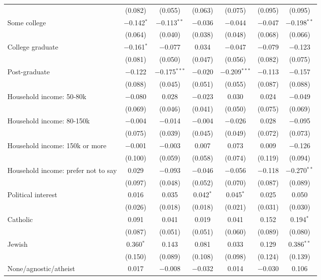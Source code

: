 \begin{tabular}{@{\extracolsep{5pt}}lcccccc}
  & (0.082) & (0.055) & (0.063) & (0.075) & (0.095) & (0.095) \\ 
  Some college & $-$0.142$^{*}$ & $-$0.113$^{**}$ & $-$0.036 & $-$0.044 & $-$0.047 & $-$0.198$^{**}$ \\ 
  & (0.064) & (0.040) & (0.038) & (0.048) & (0.068) & (0.066) \\ 
  College graduate & $-$0.161$^{*}$ & $-$0.077 & 0.034 & $-$0.047 & $-$0.079 & $-$0.123 \\ 
  & (0.081) & (0.050) & (0.047) & (0.056) & (0.082) & (0.075) \\ 
  Post-graduate & $-$0.122 & $-$0.175$^{***}$ & $-$0.020 & $-$0.209$^{***}$ & $-$0.113 & $-$0.157 \\ 
  & (0.088) & (0.045) & (0.051) & (0.055) & (0.087) & (0.088) \\ 
  Household income: 50-80k & $-$0.080 & 0.028 & $-$0.023 & 0.030 & 0.024 & $-$0.049 \\ 
  & (0.069) & (0.046) & (0.041) & (0.050) & (0.075) & (0.069) \\ 
  Household income: 80-150k & $-$0.004 & $-$0.014 & $-$0.004 & $-$0.026 & 0.028 & $-$0.095 \\ 
  & (0.075) & (0.039) & (0.045) & (0.049) & (0.072) & (0.073) \\ 
  Household income: 150k or more & $-$0.001 & $-$0.003 & 0.007 & 0.073 & 0.009 & $-$0.126 \\ 
  & (0.100) & (0.059) & (0.058) & (0.074) & (0.119) & (0.094) \\ 
  Household income: prefer not to say & 0.029 & $-$0.093 & $-$0.046 & $-$0.056 & $-$0.118 & $-$0.270$^{**}$ \\ 
  & (0.097) & (0.048) & (0.052) & (0.070) & (0.087) & (0.089) \\ 
  Political interest & 0.016 & 0.035 & 0.042$^{*}$ & 0.045$^{*}$ & 0.025 & 0.050 \\ 
  & (0.026) & (0.018) & (0.018) & (0.021) & (0.031) & (0.030) \\ 
  Catholic & 0.091 & 0.041 & 0.019 & 0.041 & 0.152 & 0.194$^{*}$ \\ 
  & (0.087) & (0.051) & (0.051) & (0.060) & (0.089) & (0.080) \\ 
  Jewish & 0.360$^{*}$ & 0.143 & 0.081 & 0.033 & 0.129 & 0.386$^{**}$ \\ 
  & (0.150) & (0.089) & (0.108) & (0.098) & (0.124) & (0.139) \\ 
  None/agnostic/atheist & 0.017 & $-$0.008 & $-$0.032 & 0.014 & $-$0.030 & 0.106 \\ 

\end{tabular}
